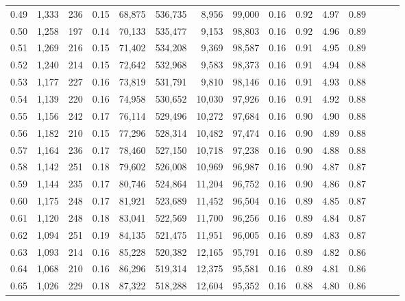 \begin{tabular}{rrrrrrrrrrrrrrr}
0.49 &   1,333 &    236 &  0.15 &   68,875 &  536,735 &    8,956 &   99,000 &  0.16 &  0.92 &  4.97 &      0.89 \\
0.50 &   1,258 &    197 &  0.14 &   70,133 &  535,477 &    9,153 &   98,803 &  0.16 &  0.92 &  4.96 &      0.89 \\
0.51 &   1,269 &    216 &  0.15 &   71,402 &  534,208 &    9,369 &   98,587 &  0.16 &  0.91 &  4.95 &      0.89 \\
0.52 &   1,240 &    214 &  0.15 &   72,642 &  532,968 &    9,583 &   98,373 &  0.16 &  0.91 &  4.94 &      0.88 \\
0.53 &   1,177 &    227 &  0.16 &   73,819 &  531,791 &    9,810 &   98,146 &  0.16 &  0.91 &  4.93 &      0.88 \\
0.54 &   1,139 &    220 &  0.16 &   74,958 &  530,652 &   10,030 &   97,926 &  0.16 &  0.91 &  4.92 &      0.88 \\
0.55 &   1,156 &    242 &  0.17 &   76,114 &  529,496 &   10,272 &   97,684 &  0.16 &  0.90 &  4.90 &      0.88 \\
0.56 &   1,182 &    210 &  0.15 &   77,296 &  528,314 &   10,482 &   97,474 &  0.16 &  0.90 &  4.89 &      0.88 \\
0.57 &   1,164 &    236 &  0.17 &   78,460 &  527,150 &   10,718 &   97,238 &  0.16 &  0.90 &  4.88 &      0.88 \\
0.58 &   1,142 &    251 &  0.18 &   79,602 &  526,008 &   10,969 &   96,987 &  0.16 &  0.90 &  4.87 &      0.87 \\
0.59 &   1,144 &    235 &  0.17 &   80,746 &  524,864 &   11,204 &   96,752 &  0.16 &  0.90 &  4.86 &      0.87 \\
0.60 &   1,175 &    248 &  0.17 &   81,921 &  523,689 &   11,452 &   96,504 &  0.16 &  0.89 &  4.85 &      0.87 \\
0.61 &   1,120 &    248 &  0.18 &   83,041 &  522,569 &   11,700 &   96,256 &  0.16 &  0.89 &  4.84 &      0.87 \\
0.62 &   1,094 &    251 &  0.19 &   84,135 &  521,475 &   11,951 &   96,005 &  0.16 &  0.89 &  4.83 &      0.87 \\
0.63 &   1,093 &    214 &  0.16 &   85,228 &  520,382 &   12,165 &   95,791 &  0.16 &  0.89 &  4.82 &      0.86 \\
0.64 &   1,068 &    210 &  0.16 &   86,296 &  519,314 &   12,375 &   95,581 &  0.16 &  0.89 &  4.81 &      0.86 \\
0.65 &   1,026 &    229 &  0.18 &   87,322 &  518,288 &   12,604 &   95,352 &  0.16 &  0.88 &  4.80 &      0.86 \\

\end{tabular}
